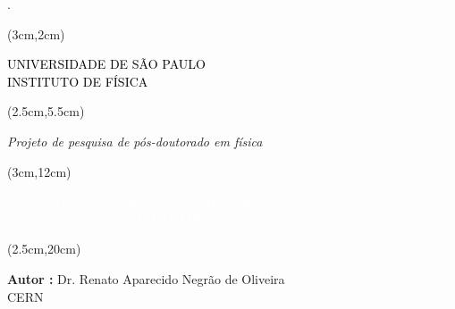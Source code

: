 \begin{titlepage}.
    

    \vspace{3.5cm}

    
    \begin{textblock*}{15cm}(3cm,2cm)
        \begin{Huge}
            \begin{center}
                \makeatletter
                \noindent\textcolor{black}{UNIVERSIDADE DE SÃO PAULO \\ INSTITUTO DE FÍSICA}
                \makeatother
            \end{center}
        \end{Huge}
    \end{textblock*}
    
    \begin{textblock*}{15cm}(2.5cm,5.5cm)
        \makeatletter
        \begin{LARGE}
            \begin{center}
                \color{black}
                {\it Projeto de pesquisa de pós-doutorado em física }\\
            \end{center}
         \end{LARGE}
     
    \end{textblock*}
    
    \begin{textblock*}{15cm}(3cm,12cm)
        \begin{Huge}
            \begin{center}
                \makeatletter
                \noindent\textcolor{white}{Desenvolvimento de um detector de silício frontal para a medida de trajetórias e tempo no experimento ATLAS-LHC}
                \makeatother
            \end{center}
        \end{Huge}
    \end{textblock*}

    \begin{textblock*}{15cm}(2.5cm,20cm)
        \begin{LARGE}
        \begin{center}
            \color{black}
                \textbf{Autor :} Dr. Renato Aparecido Negrão de Oliveira \\ CERN \\ 
        \end{center}
            

\end{LARGE}
\end{textblock*}
\end{titlepage}
